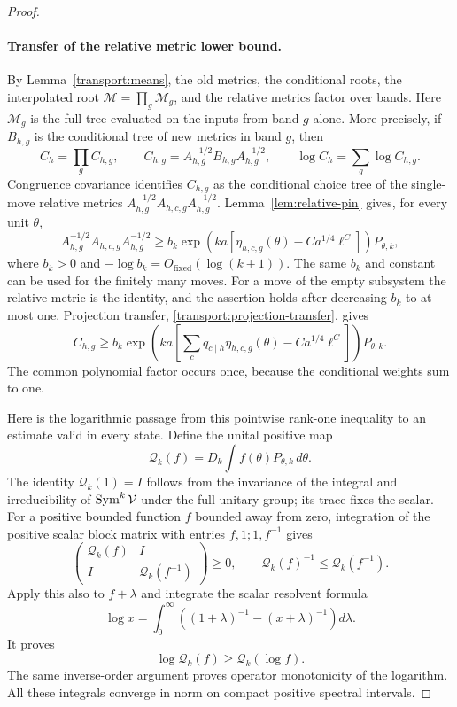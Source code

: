 \begin{proof}
\paragraph{Transfer of the relative metric lower bound.}
By Lemma~\ref{transport:means}, the old metrics, the conditional roots,
the interpolated root $\mathcal M=\prod_g\mathcal M_g$, and the
relative metrics factor over bands.  Here $\mathcal M_g$ is the full
tree evaluated on the inputs from band $g$ alone.  More precisely, if
$B_{h,g}$ is the conditional tree of new metrics in band $g$, then
\begin{equation}\label{transport:relative-factorization}
 C_h=\prod_g C_{h,g},\qquad
 C_{h,g}=A_{h,g}^{-1/2}B_{h,g}A_{h,g}^{-1/2},\qquad
 \log C_h=\sum_g\log C_{h,g}.
\end{equation}
Congruence covariance identifies $C_{h,g}$ as the conditional choice
tree of the single-move relative metrics
$A_{h,g}^{-1/2}A_{h,c,g}A_{h,g}^{-1/2}$.
Lemma~\ref{lem:relative-pin} gives, for every unit $\theta$,
\[
 A_{h,g}^{-1/2}A_{h,c,g}A_{h,g}^{-1/2}
 \geq b_k\exp\!\left(ka\left[
       \eta_{h,c,g}(\theta)-C a^{1/4}\ell^C\right]\right)P_{\theta,k},
\]
where $b_k>0$ and $-\log b_k=O_{\mathrm{fixed}}(\log(k+1))$.
The same $b_k$ and constant can be used for the finitely many moves.
For a move of the empty subsystem the relative metric is the identity,
and the assertion holds after decreasing $b_k$ to at most one.
Projection transfer, \eqref{transport:projection-transfer}, gives
\begin{equation}\label{transport:conditional-pin}
 C_{h,g}\geq b_k
 \exp\!\left(ka\left[\sum_cq_{c\mid h}\eta_{h,c,g}(\theta)
                    -C a^{1/4}\ell^C\right]\right)P_{\theta,k}.
\end{equation}
The common polynomial factor occurs once, because the conditional
weights sum to one.

Here is the logarithmic passage from this pointwise rank-one inequality
to an estimate valid in every state.  Define the unital positive map
\[
 \mathcal Q_k(f)=D_k\int f(\theta)P_{\theta,k}\,d\theta.
\]
The identity $\mathcal Q_k(1)=I$ follows from the invariance of the
integral and irreducibility of $\operatorname{Sym}^k\mathcal V$ under the full unitary
group; its trace fixes the scalar.  For a positive bounded function
$f$ bounded away from zero, integration of the positive scalar block
matrix with entries $f,1;1,f^{-1}$ gives
\[
 \begin{pmatrix}\mathcal Q_k(f)&I\\I&\mathcal Q_k(f^{-1})\end{pmatrix}
 \geq0,\qquad
 \mathcal Q_k(f)^{-1}\leq\mathcal Q_k(f^{-1}).
\]
Apply this also to $f+\lambda$ and integrate the scalar resolvent
formula
\[
 \log x=\int_0^\infty
       \left((1+\lambda)^{-1}-(x+\lambda)^{-1}\right)d\lambda.
\]
It proves
\begin{equation}\label{transport:log-jensen}
 \log\mathcal Q_k(f)\geq\mathcal Q_k(\log f).
\end{equation}
The same inverse-order argument proves operator monotonicity of the
logarithm.  All these integrals converge in norm on compact positive
spectral intervals.


\end{proof}

